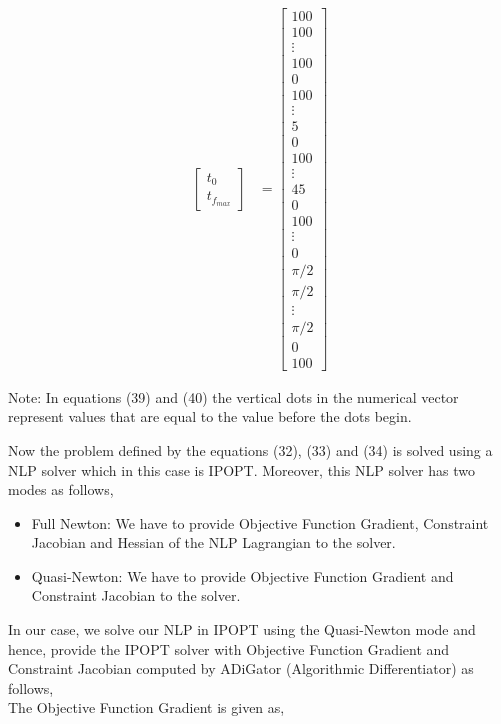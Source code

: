 \documentclass[11pt,usenames]{article}
\begin{document}
\begin{align}
\begin{bmatrix}
	t_{0} \\ 
	t_{f_{max}}  
	\end{bmatrix}
	&=
	\begin{bmatrix}
	100 \\ 100 \\ \vdots \\  100 \\  
	0 \\ 100 \\ \vdots \\  5 \\ 
	0 \\ 100 \\ \vdots \\  45 \\ 
	0 \\ 100 \\ \vdots \\  0 \\ 
	\pi /2 \\ \pi /2 \\ \vdots \\  \pi /2 \\ 
	0 \\ 
	100  
	\end{bmatrix}
	\end{align}
	
	Note: In equations (39) and (40) the vertical dots in the numerical vector represent values that are equal to the value before the dots begin.
	
	Now the problem defined by the equations (32), (33) and (34) is solved using a NLP solver which in this case is IPOPT. Moreover, this NLP solver has two modes as follows, 
	
	\begin{itemize}
		\item Full Newton: We have to provide Objective Function Gradient, Constraint Jacobian and Hessian of the NLP Lagrangian to the solver.
		\item Quasi-Newton: We have to provide Objective Function Gradient and Constraint Jacobian to the solver.
	\end{itemize}
	
	In our case, we solve our NLP in IPOPT using the Quasi-Newton mode and hence, provide the IPOPT solver with Objective Function Gradient and Constraint Jacobian computed by ADiGator (Algorithmic Differentiator) as follows, \\
	
	The Objective Function Gradient is given as,
	
\end{document}

